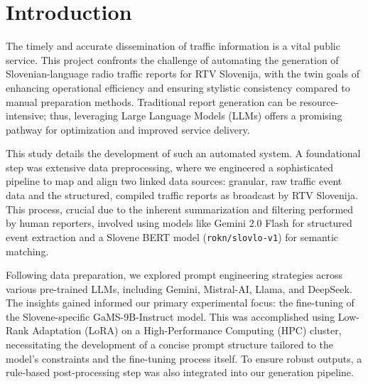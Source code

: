 \documentclass[fleqn,moreauthors,10pt]{ds_report}
\affiliation{\textit{Advisors: Slavko Žitnik}}
\begin{document}
\flushbottom 

\maketitle 

\thispagestyle{empty} 


\section*{Introduction}
The timely and accurate dissemination of traffic information is a vital public service. This project confronts the challenge of automating the generation of Slovenian-language radio traffic reports for RTV Slovenija, with the twin goals of enhancing operational efficiency and ensuring stylistic consistency compared to manual preparation methods. Traditional report generation can be resource-intensive; thus, leveraging Large Language Models (LLMs) offers a promising pathway for optimization and improved service delivery.

This study details the development of such an automated system. A foundational step was extensive data preprocessing, where we engineered a sophisticated pipeline to map and align two linked data sources: granular, raw traffic event data and the structured, compiled traffic reports as broadcast by RTV Slovenija. This process, crucial due to the inherent summarization and filtering performed by human reporters, involved using models like Gemini 2.0 Flash for structured event extraction and a Slovene BERT model (\texttt{rokn/slovlo-v1}) for semantic matching.

Following data preparation, we explored prompt engineering strategies across various pre-trained LLMs, including Gemini, Mistral-AI, Llama, and DeepSeek. The insights gained informed our primary experimental focus: the fine-tuning of the Slovene-specific GaMS-9B-Instruct model. This was accomplished using Low-Rank Adaptation (LoRA) on a High-Performance Computing (HPC) cluster, necessitating the development of a concise prompt structure tailored to the model's constraints and the fine-tuning process itself. To ensure robust outputs, a rule-based post-processing step was also integrated into our generation pipeline.
\end{document}
